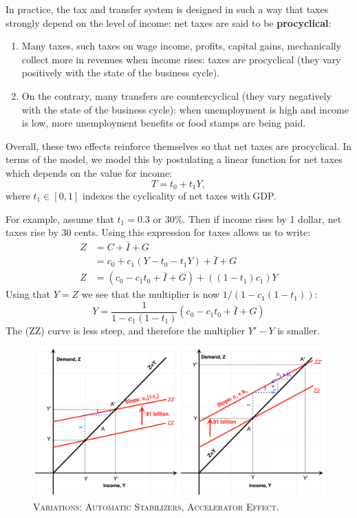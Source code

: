 \documentclass[]{book}
\theoremstyle{definition}
\theoremstyle{definition}
\theoremstyle{definition}
\theoremstyle{remark}
\begin{document}
In practice, the tax and transfer system is designed in such a way that
taxes strongly depend on the level of income: net taxes are said to be
\textbf{procyclical}:

\begin{enumerate}
\def\labelenumi{\arabic{enumi}.}
\item
  Many taxes, such taxes on wage income, profits, capital gains,
  mechanically collect more in revenues when income rises: taxes are
  procyclical (they vary positively with the state of the business
  cycle).
\item
  On the contrary, many transfers are countercyclical (they vary
  negatively with the state of the business cycle): when unemployment is
  high and income is low, more unemployment benefits or food stamps are
  being paid.
\end{enumerate}

Overall, these two effects reinforce themselves so that net taxes are
procyclical. In terms of the model, we model this by postulating a
linear function for net taxes which depends on the value for income:
\[T=t_{0}+t_{1}Y,\] where \(t_1 \in [0,1]\) indexes the cyclicality of
net taxes with GDP.

For example, assume that \(t_1=0.3\) or 30\%. Then if income rises by 1
dollar, net taxes rise by 30 cents. Using this expression for taxes
allows us to write: \[
\begin{aligned}
Z   &=C+\bar{I}+G\\
    &=c_{0}+c_{1}\left(Y-t_{0}-t_{1}Y\right)+\bar{I}+G\\
Z   &=\left(c_{0}-c_{1}t_{0}+\bar{I}+G\right)+\left(\left(1-t_{1}\right)c_{1}\right)Y
\end{aligned}
\] Using that \(Y=Z\) we see that the multiplier is now
\(1/(1-c_1(1-t_1))\):
\[Y=\frac{1}{1-c_{1}\left(1-t_{1}\right)}\left(c_{0}-c_{1}t_{0}+\bar{I}+G\right)\]
The (ZZ) curve is less steep, and therefore the multiplier \(Y'-Y\) is
smaller.




\begin{figure}

{\centering \includegraphics[width=1\linewidth]{graphsketcher/keynesian-cross-variations-merged} 

}

\caption{\textsc{Variations: Automatic Stabilizers,
Accelerator Effect}.}\label{fig:keynes-variations}
\end{figure}
\end{document}
